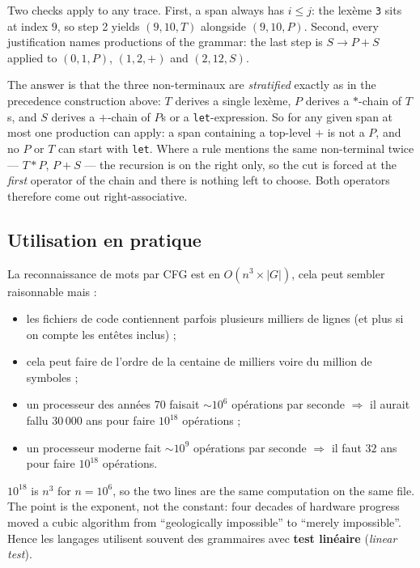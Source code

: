 \begin{remark}
  Two checks apply to any trace. First, a span always has $i \leq j$: the
  lexème \verb|3| sits at index $9$, so step 2 yields $(9,10,T)$ alongside
  $(9,10,P)$. Second, every justification names productions of the grammar:
  the last step is $S \to P + S$ applied to $(0,1,P)$, $(1,2,+)$ and
  $(2,12,S)$.
\end{remark}

\begin{remark}
  The answer is that the three non-terminaux are \emph{stratified} exactly as
  in the precedence construction above: $T$ derives a single lexème, $P$
  derives a $*$-chain of $T$s, and $S$ derives a $+$-chain of $P$s or a
  \verb|let|-expression. So for any given span at most one production can apply:
  a span containing a top-level $+$ is not a $P$, and no $P$ or $T$ can start
  with \verb|let|. Where a rule mentions the same non-terminal twice --- $T*P$,
  $P+S$ --- the recursion is on the right only, so the cut is forced at the
  \emph{first} operator of the chain and there is nothing left to choose. Both
  operators therefore come out right-associative.
\end{remark}

\subsection{Utilisation en pratique}
La reconnaissance de mots par CFG est en $O(n^{3} \times |G|)$, cela peut
sembler raisonnable mais :

\begin{itemize}
  \item les fichiers de code contiennent parfois plusieurs milliers de lignes
    (et plus si on compte les entêtes inclus) ;
  \item cela peut faire de l'ordre de la centaine de milliers voire du million
    de symboles ;
  \item un processeur des années 70 faisait $\sim 10^{6}$ opérations par
    seconde $\Rightarrow$ il aurait fallu $30\,000$ ans pour faire $10^{18}$
    opérations ;
  \item un processeur moderne fait $\sim 10^{9}$ opérations par seconde
    $\Rightarrow$ il faut $32$ ans pour faire $10^{18}$ opérations.
\end{itemize}

\begin{remark}
  $10^{18}$ is $n^{3}$ for $n = 10^{6}$, so the two lines are the same
  computation on the same file. The point is the exponent, not the constant:
  four decades of hardware progress moved a cubic algorithm from
  ``geologically impossible'' to ``merely impossible''. Hence les langages
  utilisent souvent des grammaires avec \textbf{test linéaire}
  (\textit{linear test}).
\end{remark}

